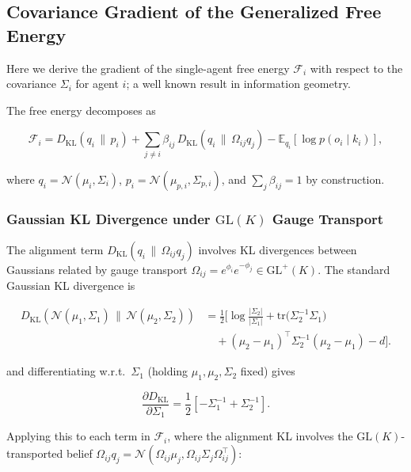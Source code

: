 \documentclass[twoside,11pt]{article}
\begin{document}
\subsection{Covariance Gradient of the Generalized Free Energy}

Here we derive the gradient of the single-agent free energy $\mathcal{F}_i$ with respect to the covariance $\Sigma_i$ for agent $i$; a well known result in information geometry.

The free energy decomposes as

\begin{equation}
\mathcal{F}_i
=D_{\mathrm{KL}}(q_i \,\|\, p_i)
+ \sum_{j \neq i} \beta_{ij}\,
D_{\mathrm{KL}}(q_i \,\|\, \Omega_{ij} q_j)
- \mathbb{E}_{q_i}[\log p(o_i \mid k_i)],
\end{equation}

where $q_i = \mathcal{N}(\mu_i, \Sigma_i)$, $p_i = \mathcal{N}(\mu_{p,i}, \Sigma_{p,i})$, and $\sum_j \beta_{ij} = 1$ by construction.

\subsubsection{Gaussian KL Divergence under $\mathrm{GL}(K)$ Gauge Transport}

The alignment term $D_{\mathrm{KL}}(q_i \,\|\, \Omega_{ij} q_j)$ involves KL divergences between Gaussians related by gauge transport $\Omega_{ij} = e^{\phi_i}e^{-\phi_j} \in \mathrm{GL}^+(K)$. The standard Gaussian KL divergence is

\begin{align}
D_{\mathrm{KL}}\!\left(
\mathcal{N}(\mu_1, \Sigma_1)
\,\|\, 
\mathcal{N}(\mu_2, \Sigma_2)
\right)
&=
\frac{1}{2}
\Big[
\log \frac{|\Sigma_2|}{|\Sigma_1|}
+ \mathrm{tr}\!\big(\Sigma_2^{-1}\Sigma_1\big)
\\ &\quad
+ (\mu_2 - \mu_1)^\top
  \Sigma_2^{-1}
  (\mu_2 - \mu_1)
- d
\Big].
\label{eq:gaussian_KL}
\end{align}


and differentiating w.r.t.\ $\Sigma_1$ (holding $\mu_1,\mu_2,\Sigma_2$ fixed) gives

\begin{equation}
\frac{\partial D_{\mathrm{KL}}}{\partial \Sigma_1}
=\frac{1}{2}\left[
-\Sigma_1^{-1}
+ \Sigma_2^{-1}
\right].
\end{equation}

Applying this to each term in $\mathcal{F}_i$, where the alignment KL involves the $\mathrm{GL}(K)$-transported belief $\Omega_{ij} q_j = \mathcal{N}(\Omega_{ij}\mu_j, \Omega_{ij}\Sigma_j\Omega_{ij}^\top)$:
\end{document}
